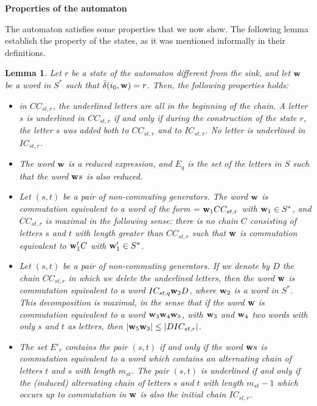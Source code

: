\documentclass[reqno,12pt]{amsart}
\newtheorem{lemma}[Theorem]{Lemma}
\theoremstyle{definition}
\begin{document}
{\bf Properties of the automaton}

The automaton satisfies some properties that we now show.  The following lemma establish the property of the states, as it was mentioned informally in their definitions.
\begin{lemma}\label{lemme1}Let  $r$ be a state of the automaton different from the sink, and let ${\bf w}$ be a word in $S^*$ such that $\bar{\delta}(i_0,{\bf w})=r$. Then, the following properties holds:

\begin{itemize}

\item[($i$)] in $CC_{st,r}$, the underlined letters are all in the beginning of the chain. A letter $s$ is underlined in  $CC_{st,r}$  if and only if during the construction of the state $r$, the letter $s$ was added both to $CC_{st,r}$ and to $IC_{st,r}$. No letter is underlined in $IC_{st,r}$.

\item[($ii$)] The word ${\bf w}$ is a reduced expression, and  $E_q$ is the set of the letters in $S$ such that the word ${\bf w}s$ is also reduced.

\item[($iii$)] Let  $(s,t)$ be a pair of non-commuting generators. The word ${\bf w}$ is commutation equivalent to a word of the form  = ${\bf w}_1CC_{st,r}$ with ${\bf w}_1 \in S^*$, and $CC_{st,r}$ is maximal in the following sense: there is no chain  $C$ consisting of letters $s$ and $t$ with length greater than $CC_{st,r}$ such that ${\bf w}$ is commutation equivalent to ${\bf w}_1' C$ with ${\bf w}_1' \in S^*$.

\item[($iv$)]Let  $(s,t)$ be a pair of non-commuting generators. If we denote by   $D$ the chain $CC_{st,r}$ in which we delete the underlined letters, then the word   ${\bf w}$  is commutation equivalent to a word $IC_{st,q} {\bf w}_2 D$, where ${\bf w}_2$ is a word in $S^*$. This decomposition is maximal, in the sense that if the word  ${\bf w}$ is commutation equivalent to a word ${\bf w}_3{\bf w}_4{\bf w}_5$, with ${\bf w}_3$ and ${\bf w}_4$ two words with only  $s$ and $t$ as letters, then $|{\bf w}_5{\bf w}_3|\leq |DIC_{st,r}|$.

\item[($v$)] The set $E'_r$ contains the pair $(s,t)$ if and only if the word ${\bf w}s$ is commutation equivalent to a word  which contains an alternating chain of letters $t$ and $s$ with length $m_{st}$. The pair $(s,t)$ is underlined if and only if the (induced) alternating chain of letters  $s$ and $t$ with length $m_{st}-1$ which occurs up to commutation in  ${\bf w}$ is also the initial chain $IC_{st,r}$.

\end{itemize}
\end{lemma}
\medskip
\end{document}
